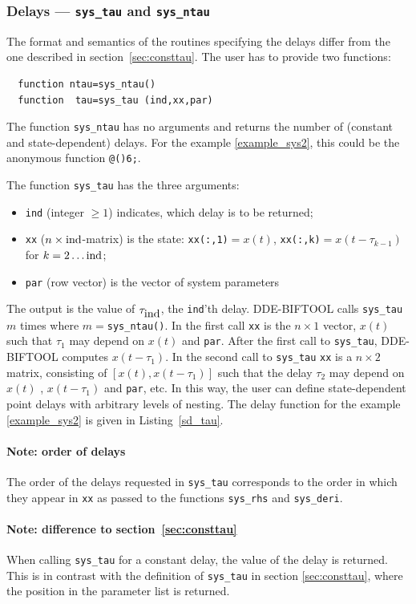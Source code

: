 \documentclass[10pt]{scrartcl}
\newcommand{\DDEBIFCODE}{\textsc{DDE-BIFTOOL}}
\newcommand{\blist}[1]{\mbox{\lstinline!#1!}}
\begin{document}
\subsubsection{Delays --- \blist{sys_tau} and \blist{sys_ntau}}
\label{sec:sdtau}
The format and semantics of the routines specifying the delays differ
from the one described in section~\ref{sec:consttau}. The user has to provide two functions:
\begin{lstlisting}
  function ntau=sys_ntau()        
  function  tau=sys_tau (ind,xx,par)
\end{lstlisting}
The function \blist{sys_ntau} has no arguments and  returns the number of (constant and state-dependent) delays. For the example \eqref{example_sys2}, this could be the anonymous function \blist{@()6;}.

The function \blist{sys_tau} has the three arguments:
\begin{itemize}
\item \blist{ind} (integer $\geq1$) indicates, which delay is to be returned;
\item \blist{xx} ($ n\times\blist{ind}$-matrix) is the state:
  \blist{xx(:,1)}$=x(t)$, \blist{xx(:,k)}$=x(t-\tau_{k-1})$ for
  $k=2\ldots\blist{ind}$;
\item \blist{par} (row vector) is the vector of system parameters
\end{itemize}
The output is the value of $\tau_{\blist{ind}}$, the \blist{ind}'th
delay. \DDEBIFCODE{} calls \blist{sys_tau} $m$ times
where $m=$\blist{sys_ntau()}. In the first call \blist{xx} is the
$n\times1$ vector, $x(t)$ such that $\tau_1$ may depend on $x(t)$ and
\blist{par}. After the first call to \blist{sys_tau}, \DDEBIFCODE{}
computes $x(t-\tau_1)$. In the second call to \blist{sys_tau}
\blist{xx} is a $n\times2$ matrix, consisting of $[x(t),x(t-\tau_1)]$
such that the delay $\tau_2$ may depend on $x(t)$ , $x(t-\tau_1)$ and
\blist{par}, etc. In this way, the user can define state-dependent
point delays with arbitrary levels of nesting. The delay function for
the example \eqref{example_sys2} is given in Listing~\ref{sd_tau}.

\paragraph{Note: order of delays} The order of the delays
requested in \blist{sys_tau} corresponds to the order in which they
appear in \blist{xx} as passed to the functions \blist{sys_rhs} and
\blist{sys_deri}.
\paragraph{Note: difference to section~\ref{sec:consttau}} When calling
  \blist{sys_tau} for a constant delay, the value of the delay is
  returned.  This is in contrast with the definition of \blist{sys_tau}
  in section \ref{sec:consttau}, where the position in the parameter list
  is returned.
\end{document}
